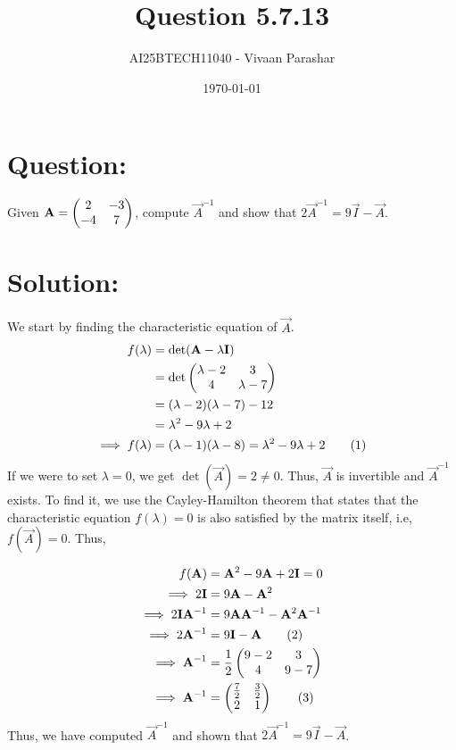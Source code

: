 \documentclass[a4paper, 12pt]{article}
\title{Question 5.7.13}
\author{AI25BTECH11040 - Vivaan Parashar}
\date{\today}
\newcommand\numberthis{\addtocounter{equation}{1}\tag{\theequation}}
\begin{document}
\maketitle

\section{Question: }
Given $\mathbf{A} = \begin{pmatrix}2 & -3 \\ -4 & 7\end{pmatrix}$, compute $\vec{A}^{-1}$ and show that $2\vec{A}^{-1} = 9\vec{I} - \vec{A}$.

\section{Solution: }
We start by finding the characteristic equation of $\vec{A}$.
\begin{align*}
    f(\lambda)          & = \det(\vec{A} - \lambda \vec{I})                                       \\
                        & = \det\myvec{\lambda - 2                                            & 3 \\ 4 & \lambda - 7} \\
                        & = (\lambda - 2)(\lambda - 7) - 12                                       \\
                        & = \lambda^2 - 9\lambda + 2                                              \\
    \implies f(\lambda) & = (\lambda - 1)(\lambda - 8) = \lambda^2 - 9\lambda + 2 \numberthis
\end{align*}
If we were to set $\lambda = 0$, we get $\det(\vec{A}) = 2 \ne 0$. Thus, $\vec{A}$ is invertible and $\vec{A}^{-1}$ exists. To find it, we use the Cayley-Hamilton theorem that states that the characteristic equation $f(\lambda) = 0$ is also satisfied by the matrix itself, i.e, $f(\vec{A}) = 0$. Thus,

\begin{align*}
    f(\vec{A})                    & = \vec{A}^2 - 9\vec{A} + 2\vec{I} = 0                        \\
    \implies 2\vec{I}             & = 9\vec{A} - \vec{A}^2                                       \\
    \implies 2\vec{I}\vec{A}^{-1} & = 9\vec{A}\vec{A}^{-1} - \vec{A}^2\vec{A}^{-1}               \\
    \implies 2\vec{A}^{-1}        & = 9\vec{I} - \vec{A}       \numberthis                       \\
    \implies \vec{A}^{-1}         & = \frac{1}{2}\myvec{9 - 2                      & 3           \\ 4 & 9 - 7} \\
    \implies \vec{A}^{-1}         & = \myvec{\frac{7}{2}                           & \frac{3}{2} \\ 2 & 1} \numberthis
\end{align*}
Thus, we have computed $\vec{A}^{-1}$ and shown that $2\vec{A}^{-1} = 9\vec{I} - \vec{A}$.
\end{document}
